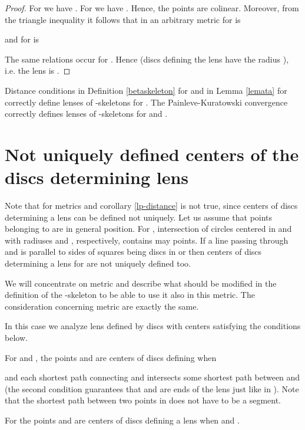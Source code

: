 \documentclass[11pt]{llncs}
\begin{document}
\begin{proof}
For  we have
.
For  we have
.
Hence, the points  are colinear.
Moreover, from the triangle inequality it follows that
in an arbitrary metric for  is 

and for  is

The same relations occur for . 
Hence  (discs defining the lens
have the radius ), i.e. the lens is .
\end{proof}

\begin{corollary}
\label{lp-distance}
Distance conditions in Definition \ref{betaskeleton} for  and in Lemma \ref{lemata}
for  correctly define lenses of -skeletons for .
The Painleve-Kuratowski convergence correctly defines lenses of -skeletons for  
and . 
\end{corollary}



\section{Not uniquely defined centers of the discs determining lens}
\label{l1-section}

Note that for metrics  and  corollary \ref{lp-distance} is not true,
since centers of discs determining a lens can be defined not uniquely.
Let us assume that points belonging to  are in general position.
For , intersection of circles centered in  and  with
radiuses  and ,
respectively, contains may points. 
If a line passing through  and  is parallel to sides of squares being discs 
in  or  then centers of discs determining a lens for  
are not uniquely defined too.
      

We will concentrate on  metric and describe what should be modified in the definition 
of the -skeleton to be able to use it also in this metric. The consideration concerning
 metric are exactly the same. 

In this case we analyze lens defined by discs with centers satisfying the conditions below.

For  and , the points  and  are centers of discs defining
 when 
 
and each shortest path connecting  and  intersects some shortest path between 
 and  (the second condition guarantees that  and 
are ends of the lens just like in ). 
Note that the shortest path between two points in  does not have to be a segment.

For  the points  and  are centers of discs defining a lens
 when  and 
 .
\end{document}
